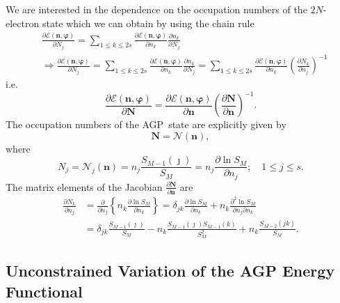 \documentclass[aps,preprint]{revtex4}%
\begin{document}
We are interested in the dependence on the occupation numbers of the
$2N$-electron state which we can obtain by using the chain rule
\begin{align}
&  \frac{\partial\mathcal{E}\left(  \boldsymbol{n,\varphi}\right)  }{\partial
N_{j}}=\sum_{1\leq k\leq2s}\frac{\partial\mathcal{E}\left(
\boldsymbol{n,\varphi}\right)  }{\partial n_{k}}\frac{\partial n_{k}}{\partial
N_{j}}\nonumber\\
&  \Rightarrow\frac{\partial\mathcal{E}\left(  \boldsymbol{n,\varphi}\right)
}{\partial N_{j}}=\sum_{1\leq k\leq2s}\frac{\partial\mathcal{E}\left(
\boldsymbol{n,\varphi}\right)  }{\partial n_{k}}\frac{\partial n_{k}}{\partial
N_{j}}=\sum_{1\leq k\leq2s}\frac{\partial\mathcal{E}\left(
\boldsymbol{n,\varphi}\right)  }{\partial n_{k}}\left(  \frac{\partial N_{k}%
}{\partial n_{j}}\right)  ^{-1}%
\end{align}
i.e.%
\begin{equation}
\frac{\partial\mathcal{E}\left(  \boldsymbol{n,\varphi}\right)  }%
{\partial\boldsymbol{N}}=\frac{\partial\mathcal{E}\left(
\boldsymbol{n,\varphi}\right)  }{\partial\boldsymbol{n}}\left(  \frac
{\partial\boldsymbol{N}}{\partial\boldsymbol{n}}\right)  ^{-1}.
\end{equation}
The occupation numbers of the AGP\ state are explicitly given by
\begin{equation}
\boldsymbol{N}=\mathcal{N}\left(  \boldsymbol{n}\right)  ,
\end{equation}
where
\begin{equation}
N_{j}=\mathcal{N}_{j}\left(  \boldsymbol{n}\right)  =n_{j}\frac{S_{M-1}\left(
\jmath\right)  }{S_{M}}=n_{j}\frac{\partial\ln S_{M}}{\partial n_{j}}%
;\quad1\leq j\leq s.
\end{equation}
The matrix elements of the Jacobian $\frac{\partial\boldsymbol{N}}%
{\partial\boldsymbol{n}}$ are
\begin{align}
\frac{\partial N_{k}}{\partial n_{j}}  &  =\frac{\partial}{\partial n_{j}%
}\left\{  n_{k}\frac{\partial\ln S_{M}}{\partial n_{k}}\right\}  =\delta
_{jk}\frac{\partial\ln S_{M}}{\partial n_{k}}+n_{k}\frac{\partial^{2}\ln
S_{M}}{\partial n_{j}\partial n_{k}}\nonumber\\
&  =\delta_{jk}\frac{S_{M-1}\left(  \jmath\right)  }{S_{M}}-n_{k}\frac
{S_{M-1}\left(  \jmath\right)  S_{M-1}\left(  k\right)  }{S_{M}^{2}}%
+n_{k}\frac{S_{M-2}\left(  jk\right)  }{S_{M}}.
\end{align}


\subsection{Unconstrained Variation of the AGP Energy Functional}
\end{document}
